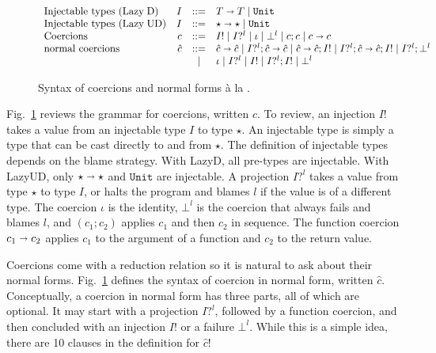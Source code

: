 \documentclass[acmsmall,review]{acmart}\settopmatter{printfolios=true,printccs=false,printacmref=false}
\newcommand{\figref}[1]{Fig.~\ref{#1}}
\newcommand{\stxrule}[3]{\text{#2} & #1 & ::= & #3\\}
\newcommand{\stxrulecont}[1]{& & | & #1 \\}
\newcommand{\lazyUD}{Lazy\;UD}
\newcommand{\lazyD}{Lazy\;D}
\newcommand{\TOOdyn}[0]{\star}
\newcommand{\POOunit}[0]{\mathtt{Unit}}
\newcommand{\POOfun}[2]{#1 \shortrightarrow #2}
\newcommand{\vOOcast}[2]{#1\langle#2\rangle}
\newcommand{\ncProj}[2]{#1?^{#2}}
\newcommand{\ncInj}[1]{#1!}
\newcommand{\ncId}[0]{\iota}
\newcommand{\ncSeq}[2]{#1;#2}
\newcommand{\ncFail}[1]{\bot^{#1}}
\newcommand{\ncFun}[2]{\POOfun{#1}{#2}}
\begin{document}
\begin{figure}
  \[
  \begin{array}{lrcl}
  \stxrule{I}{Injectable types (\lazyD)}{
    \POOfun{T}{T} \mid \POOunit}
  \stxrule{I}{Injectable types (\lazyUD)}{
    \POOfun{\TOOdyn}{\TOOdyn} \mid \POOunit
  }
  \stxrule{c}{Coercions}{
    \ncInj{I} \mid
    \ncProj{I}{l} \mid
    \ncId \mid
    \ncFail{l} \mid
    \ncSeq{c}{c} \mid
    \ncFun{c}{c}
  }
\stxrule{\hat{c}}{normal coercions}{
  \ncFun{\hat{c}}{\hat{c}} \mid
  \ncSeq{\ncProj{I}{l}}{\ncFun{\hat{c}}{\hat{c}}} \mid
  \ncSeq{\ncFun{\hat{c}}{\hat{c}}}{\ncInj{I}} \mid
  \ncSeq{\ncProj{I}{l}}{\ncSeq{\ncFun{\hat{c}}{\hat{c}}}{\ncInj{I}}} \mid
  \ncSeq{\ncProj{I}{l}}{\ncFail{l}}
}
\stxrulecont{
  \ncId \mid
  \ncProj{I}{l} \mid
  \ncInj{I} \mid
  \ncSeq{\ncProj{I}{l}}{\ncInj{I}} \mid
  \ncFail{l} 
}
  \end{array}
  \]
  \caption{Syntax of coercions and normal forms {\`a} la \citet{siek2012interpretations}.}
  \label{fig:normal-coercion}
\end{figure}

\figref{fig:normal-coercion} reviews the grammar for coercions,
written $c$.
%
To review, an injection $I!$ takes a value from an injectable type
$I$ to type $\TOOdyn$. An injectable type is simply a type that can be
cast directly to and from $\TOOdyn$. The
definition of injectable types depends on the blame strategy. With \lazyD,
all pre-types are injectable. With \lazyUD, only
$\POOfun{\TOOdyn}{\TOOdyn}$ and $\POOunit$ are injectable.
%
A projection $I?^l$ takes a value from type $\TOOdyn$ to type $I$, or
halts the program and blames $l$ if the value is of a different type.
The coercion $\iota$ is the identity, $\bot^{l}$ is the coercion that
always fails and blames $l$, and $(\ncSeq{c_1}{c_2})$ applies $c_1$ and
then $c_2$ in sequence. The function coercion $\ncFun{c_1}{c_2}$
applies $c_1$ to the argument of a function and $c_2$ to the return
value.

Coercions come with a reduction relation so it is natural to ask about
their normal forms. \figref{fig:normal-coercion} defines the syntax of
coercion in normal form, written $\hat{c}$. Conceptually, a coercion
in normal form has three parts, all of which are optional.  It may
start with a projection $I?^l$, followed by a function coercion, and
then concluded with an injection $I!$ or a failure $\bot^l$. While
this is a simple idea, there are 10 clauses in the definition for
$\hat{c}$!

\end{document}
